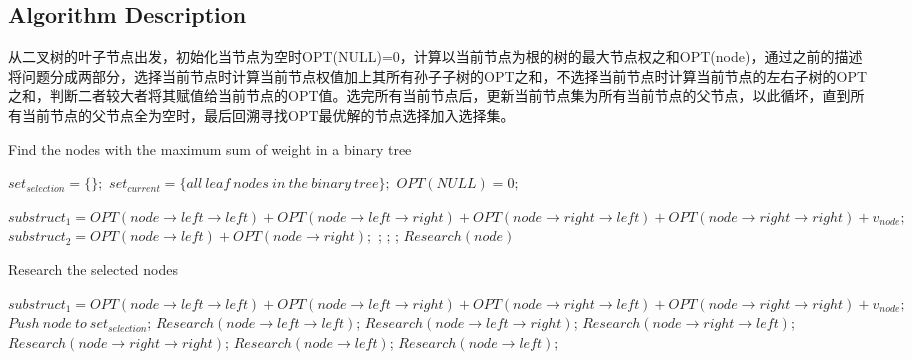 \documentclass{article}
\begin{document}
\subsection{Algorithm Description}

从二叉树的叶子节点出发，初始化当节点为空时OPT(NULL)=0，计算以当前节点为根的树的最大节点权之和OPT(node)，通过之前的描述将问题分成两部分，选择当前节点时计算当前节点权值加上其所有孙子子树的OPT之和，不选择当前节点时计算当前节点的左右子树的OPT之和，判断二者较大者将其赋值给当前节点的OPT值。选完所有当前节点后，更新当前节点集为所有当前节点的父节点，以此循坏，直到所有当前节点的父节点全为空时，最后回溯寻找OPT最优解的节点选择加入选择集。

\begin{algorithm}[htbp] 
  \caption{Find the nodes with the maximum sum of weight in a binary tree}  
  \begin{algorithmic}[1] 
	\State $set_{selection} = \{\};$
	\State $set_{current} = \{all\ leaf\ nodes\ in\ the\ binary\ tree\};$
	\State $OPT(NULL) = 0;$
	
	\State $substruct_1 = OPT(node\rightarrow left\rightarrow left) + OPT(node\rightarrow left \rightarrow right)+OPT(node\rightarrow right\rightarrow left)+OPT(node\rightarrow right\rightarrow right)+v_{node};$
	\State $substruct_2 = OPT(node\rightarrow left)+OPT(node\rightarrow right);$
	;
	;
	;
	\EndFor
	\State $Research(node)$
	\EndFunction  
  \end{algorithmic}  
\end{algorithm} 

\begin{algorithm}[htbp] 
  \caption{Research the selected nodes}  
  \begin{algorithmic}[1] 
	\State $substruct_1 = OPT(node\rightarrow left\rightarrow left) + OPT(node\rightarrow left \rightarrow right)+OPT(node\rightarrow right\rightarrow left)+OPT(node\rightarrow right\rightarrow right)+v_{node};$
	\State $Push\ node\ to\ set_{selection}$;
	\State $Research(node\rightarrow left\rightarrow left)$;
	\State $Research(node\rightarrow left \rightarrow right)$;
	\State $Research(node\rightarrow right\rightarrow left)$;
	\State $Research(node\rightarrow right\rightarrow right)$;
	\Else
	\State $Research(node\rightarrow left)$;
	\State $Research(node\rightarrow left)$;
	\EndIf
	\EndFunction  
  \end{algorithmic}  
\end{algorithm} 
\end{document}
